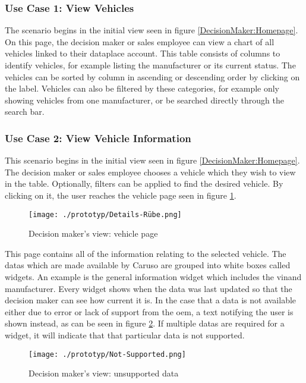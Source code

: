 \subsubsection{Use Case 1: View Vehicles}
The scenario begins in the initial view seen in figure \ref{DecisionMaker:Homepage}. On this page, the decision maker or sales employee can view a chart of all vehicles linked to their \gls{dataplace} account. This table consists of columns to identify vehicles, for example listing the manufacturer or its current status. The vehicles can be sorted by column in ascending or descending order by clicking on the label. Vehicles can also be filtered by these categories, for example only showing vehicles from one manufacturer, or be searched directly through the search bar.

\subsubsection{Use Case 2: View Vehicle Information}
This scenario begins in the initial view seen in figure \ref{DecisionMaker:Homepage}. The decision maker or sales employee chooses a vehicle which they wish to view in the table. Optionally, filters can be applied to find the desired vehicle. By clicking on it, the user reaches the vehicle page seen in figure \ref{DecisionMaker:DetailsRube}.

\begin{figure}[ht]
  \centering
  \texttt{[image: ./prototyp/Details-Rübe.png]}
  \caption{Decision maker's view: vehicle page}
  \label{DecisionMaker:DetailsRube}
\end{figure}

This page contains all of the information relating to the selected vehicle. The \glspl{data} which are made available by Caruso are grouped into white boxes called \glspl{widget}. An example is the general information \gls{widget} which includes the \gls{vin}and manufacturer. Every \gls{widget} shows when the data was last updated so that the decision maker can see how current it is. In the case that a \gls{data} is not available either due to error or lack of support from the \gls{oem}, a text notifying the user is shown instead, as can be seen in figure \ref{DecisionMaker:NotSupported}. If multiple \glspl{data} are required for a \gls{widget}, it will indicate that that particular \gls{data} is not supported.


\begin{figure}[ht]
  \centering
  \texttt{[image: ./prototyp/Not-Supported.png]}
  \caption{Decision maker's view: unsupported \gls{data}}
  \label{DecisionMaker:NotSupported}
\end{figure}

